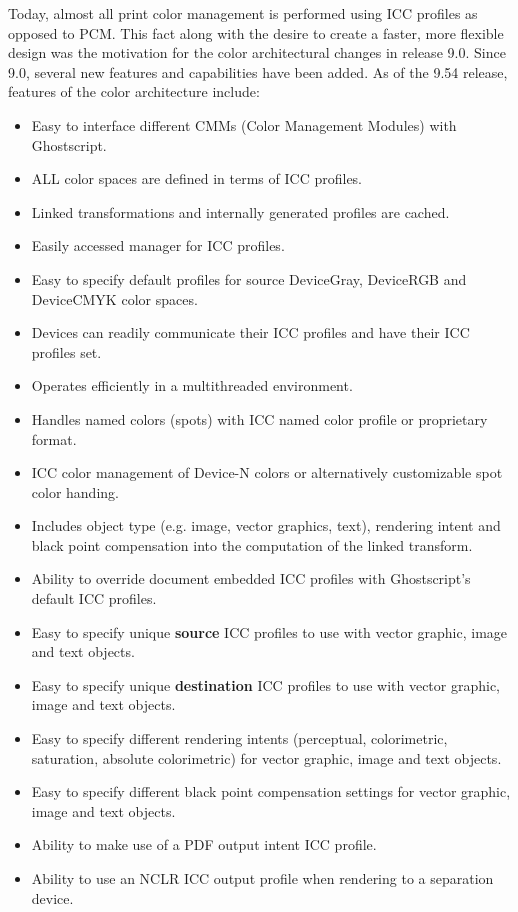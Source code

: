\documentclass[12pt,notitlepage]{article}
\begin{document}
Today, almost all print color management is performed using ICC profiles as opposed to PCM.  This fact along with the desire to create a faster, more flexible design was the motivation for the color architectural changes in release 9.0.  Since 9.0, several new features and capabilities  have been added. As of the 9.54 release, features of the color architecture include:
\begin{itemize}
\item Easy to interface different CMMs (Color Management Modules) with Ghostscript.
\item ALL color spaces are defined in terms of ICC profiles.
\item Linked transformations and internally generated profiles are cached.
\item Easily accessed manager for ICC profiles.
\item Easy to specify default profiles for source DeviceGray, DeviceRGB and DeviceCMYK color spaces.
\item Devices can readily communicate their ICC profiles and have their ICC profiles set.
\item Operates efficiently in a multithreaded environment.
\item Handles named colors (spots) with ICC named color profile or proprietary format.
\item ICC color management of Device-N colors or alternatively customizable spot color handing.
\item Includes object type (e.g. image, vector graphics, text), rendering intent and black point compensation into the computation of the linked transform.
\item Ability to override document embedded ICC profiles with Ghostscript's default ICC profiles.
\item Easy to specify unique {\bf source} ICC profiles to use with vector graphic, image and text objects.
\item Easy to specify unique {\bf destination} ICC profiles to use with vector graphic, image and text objects.
\item Easy to specify different rendering intents (perceptual, colorimetric, saturation, absolute colorimetric) for vector graphic, image and text objects.
\item Easy to specify different black point compensation settings for vector graphic, image and text objects.
\item Ability to make use of a PDF output intent ICC profile.
\item Ability to use an NCLR ICC output profile when rendering to a separation device.

\end{itemize}
\end{document}
